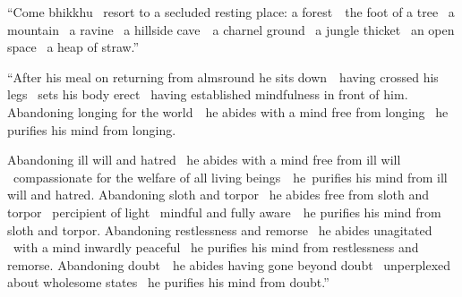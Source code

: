 \begin{english-only-justify}
  ``Come bhikkhu \breathmark\ resort to a secluded resting place: a \mbox{forest}~\breathmark\ the foot of a tree \breathmark\ a mountain \breathmark\ a ravine \breathmark\ a hillside \mbox{cave}~\breathmark\ a charnel ground \breathmark\ a jungle thicket \breathmark\ an open space \breathmark\ a heap of straw.''
\end{english-only-justify}

\ifbfive\clearpage\fi

\ifninebythirteen

\begin{english-only-justify}
  ``After his meal on returning from almsround he sits \mbox{down}~\breathmark\ having crossed his legs \breathmark\ sets his body erect \breathmark\ having established mindfulness in front of him. Abandoning longing \ifdigital\makeatletter\hyperlink{endnote61-appendix}\makeatother\thinspace\fi
  for the \mbox{world}~\breathmark\ he abides with a mind free from longing \breathmark\ he purifies his mind from longing.
\end{english-only-justify}

\clearpage

\begin{english-only-justify}
Abandoning ill will and hatred \breathmark\ he abides with a mind free from ill will \breathmark\ compassionate for the welfare of all living \mbox{beings}~\breathmark\ he~purifies his mind from ill will and hatred. Abandoning sloth and torpor \breathmark\ he abides free from sloth and torpor \breathmark\ percipient of light \breathmark\ mindful and fully \mbox{aware}~\breathmark\ he purifies his mind from sloth and torpor. Abandoning restlessness and remorse \breathmark\ he abides unagitated \breathmark\ with a mind inwardly peaceful \breathmark\ he purifies his mind from restlessness and remorse. Abandoning \mbox{doubt}~\breathmark\ he abides having gone beyond doubt \breathmark\ unperplexed about wholesome states \breathmark\ he purifies his mind from doubt.''
\end{english-only-justify}

\else

\fi

